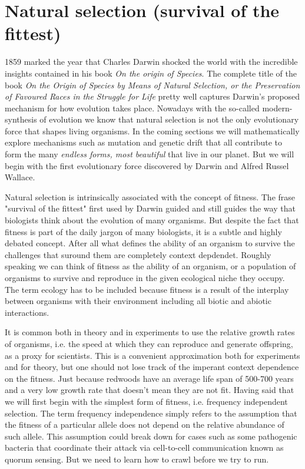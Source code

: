 \section{Natural selection (survival of the fittest)}
1859 marked the year that Charles Darwin shocked the world with the incredible
insights contained in his book \textit{On the origin of Species}. The complete 
title of the book \textit{On the Origin of Species by Means of Natural
Selection, or the Preservation of Favoured Races in the Struggle for Life}
pretty well captures Darwin's proposed mechanism for how evolution takes place.
Nowadays with the so-called modern-synthesis of evolution we know that natural
selection is not the only evolutionary force that shapes living organisms. In
the coming sections we will mathematically explore mechanisms such as mutation
and genetic drift that all contribute to form the many \textit{endless forms,
most beautiful} that live in our planet. But we will begin with the first
evolutionary force discovered by Darwin and Alfred Russel Wallace.

Natural selection is intrinsically associated with the concept of fitness. The
frase "survival of the fittest" first used by Darwin guided and still guides
the way that biologists think about the evolution of many organisms. But
despite the fact that fitness is part of the daily jargon of many biologists,
it is a subtle and highly debated concept. After all what defines the ability
of an organism to survive the challenges that suround them are completely
context depdendet. Roughly speaking we can think of fitness as the ability of
an organism, or a population of organisms to survive and reproduce in the given
ecological niche they occupy. The term ecology has to be included because
fitness is a result of the interplay between organisms with their environment
including all biotic and abiotic interactions. 

It is common both in theory and in experiments to use the relative growth rates
of organisms, i.e. the speed at which they can reproduce and generate
offspring, as a proxy for scientists. This is a convenient approximation both
for experiments and for theory, but one should not lose track of the imperant
context dependence on the fitness. Just because redwoods have an average life
span of 500-700 years and a very low growth rate that doesn't mean they are not
fit. Having said that we will first begin with the simplest form of fitness,
i.e. frequency independent selection. The term frequency independence simply
refers to the assumption that the fitness of a particular allele does not
depend on the relative abundance of such allele. This assumption could break
down for cases such as some pathogenic bacteria that coordinate their attack
via cell-to-cell communication known as quorum sensing. But we need to learn
how to crawl before we try to run.

